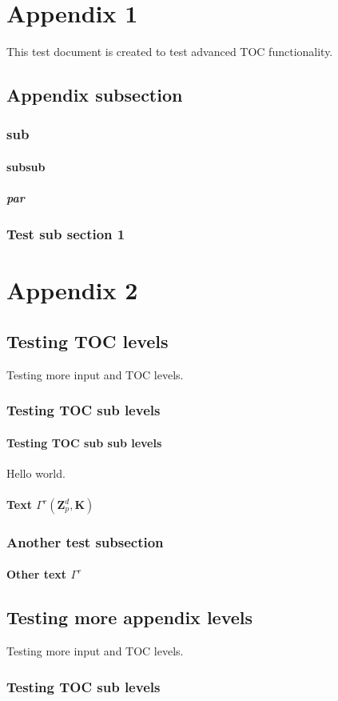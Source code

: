 \chapter{Appendix 1}
This test document is created to test advanced TOC functionality.

\section{Appendix subsection}

\subsection{sub}

\subsubsection{subsub}

\paragraph{par}

\subsection{Test sub section 1}

\chapter{Appendix 2}

\section{Testing TOC levels}
Testing more input and TOC levels.

\subsection{Testing TOC sub levels}

\subsubsection{Testing TOC sub sub levels}
Hello world.

\subsubsection{Text $\Gamma^{r}(\ensuremath{{\mathbf{Z}}}_p^d,\mathbf{K})$}

\subsection{Another test subsection}

\subsubsection{Other text $\Gamma^{r}$}

\section{Testing more appendix levels}
Testing more input and TOC levels.

\subsection{Testing TOC sub levels}

